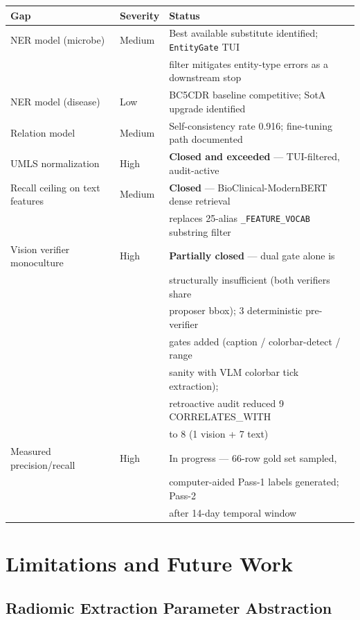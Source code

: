 \documentclass[12pt, letterpaper]{article}
\begin{document}
\begin{center}
\begin{tabular}{lll}
\textbf{Gap} & \textbf{Severity} & \textbf{Status} \\
\hline
NER model (microbe) & Medium & Best available substitute identified; \texttt{EntityGate} TUI \\
& & filter mitigates entity-type errors as a downstream stop \\
NER model (disease) & Low & BC5CDR baseline competitive; SotA upgrade identified \\
Relation model & Medium & Self-consistency rate 0.916; fine-tuning path documented \\
UMLS normalization & High & \textbf{Closed and exceeded} --- TUI-filtered, audit-active \\
Recall ceiling on text features & Medium & \textbf{Closed} --- BioClinical-ModernBERT dense retrieval \\
& & replaces 25-alias \texttt{\_FEATURE\_VOCAB} substring filter \\
Vision verifier monoculture & High & \textbf{Partially closed} --- dual gate alone is \\
& & structurally insufficient (both verifiers share \\
& & proposer bbox); 3 deterministic pre-verifier \\
& & gates added (caption / colorbar-detect / range \\
& & sanity with VLM colorbar tick extraction); \\
& & retroactive audit reduced 9 CORRELATES\_WITH \\
& & to 8 (1 vision + 7 text) \\
Measured precision/recall & High & In progress --- 66-row gold set sampled, \\
& & computer-aided Pass-1 labels generated; Pass-2 \\
& & after 14-day temporal window \\
\end{tabular}
\end{center}

\section{Limitations and Future Work}

\subsection{Radiomic Extraction Parameter Abstraction}
\end{document}
